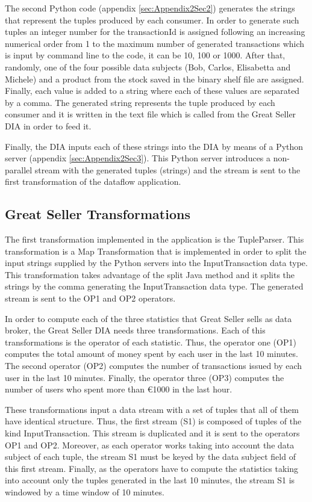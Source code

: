 The second Python code (appendix \ref{sec:Appendix2Sec2}) generates the strings that represent the tuples produced by each consumer. In order to generate such tuples an integer number for the transactionId is assigned following an increasing numerical order from 1 to the maximum number of generated transactions which is input by command line to the code, it can be 10, 100 or 1000. After that, randomly, one of the four possible data subjects (Bob, Carlos, Elisabetta and Michele) and a product from the stock saved in the binary shelf file are assigned. Finally, each value is added to a string where each of these values are separated by a comma. The generated string represents the tuple produced by each consumer and it is written in the text file which is called from the Great Seller DIA in order to feed it.

Finally, the DIA inputs each of these strings into the DIA by means of a Python server (appendix \ref{sec:Appendix2Sec3}). This Python server introduces a non-parallel stream with the generated tuples (strings) and the stream is sent to the first transformation of the dataflow application.

\subsection{Great Seller Transformations}
The first transformation implemented in the application is the TupleParser. This transformation is a Map Transformation that is implemented in order to split the input strings supplied by the Python servers into the InputTransaction data type. This transformation takes advantage of the split Java method and it splits the strings by the comma generating the InputTransaction data type. The generated stream is sent to the OP1 and OP2 operators.

In order to compute each of the three statistics that Great Seller sells as data broker, the Great Seller DIA needs three transformations. Each of this transformations is the operator of each statistic. Thus, the operator one (OP1) computes the total amount of money spent by each user in the last 10 minutes. The second operator (OP2) computes the number of transactions issued by each user in the last 10 minutes. Finally, the operator three (OP3) computes the number of users who spent more than \euro{1000} in the last hour.

These transformations input a data stream with a set of tuples that all of them have identical structure. Thus, the first stream (S1) is composed of tuples of the kind InputTransaction. This stream is duplicated and it is sent to the operators OP1 and OP2. Moreover, as each operator works taking into account the data subject of each tuple, the stream S1 must be keyed by the data subject field of this first stream. Finally, as the operators have to compute the statistics taking into account only the tuples generated in the last 10 minutes, the stream S1 is windowed by a time window of 10 minutes.

